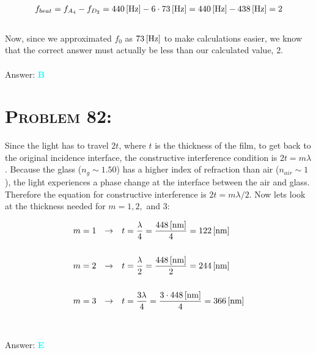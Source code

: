 \documentclass{article}
\begin{document}
\begin{gather}
\label {eq: beatfreq} f_{beat} = f_{A_{4}} - f_{D_{2}} = \unit[440]{[Hz]} - 6 \cdot  \unit[73]{[Hz]} = \unit[440]{[Hz]} - \unit[438]{[Hz]} = 2\nonumber
\end{gather}
\\
Now, since we approximated $f_{0}$ as $\unit[73]{[Hz]}$ to make calculations easier, we know that the correct answer must actually be less than our calculated value, 2. 
\\\\
Answer: \textbf{\textcolor{cyan}B}\\


\section{\textsc{Problem 82:}} Since the light has to travel $2t$, where $t$ is the thickness of the film, to get back to the original incidence interface, the constructive interference condition is $2t = m\lambda$. Because the glass ($n_{g} \sim 1.50 $) has a higher index of refraction than air ($n_{air} \sim 1$), the light experiences a phase change at the interface between the air and glass. Therefore the equation for constructive interference is $2t = m\lambda/2$. Now lets look at the thickness needed for $m = 1, 2,$ and $3$:

\begin{align}
m = 1 \hspace{.1in} &\rightarrow \hspace{.1in} t = \frac {\lambda}{4} = \frac {\unit[448]{[nm]}}{4} = \unit[122]{[nm]}\nonumber\\
\nonumber\\
%
m = 2 \hspace{.1in} &\rightarrow \hspace{.1in} t = \frac {\lambda}{2} = \frac {\unit[448]{[nm]}}{2} = \unit[244]{[nm]}\nonumber\\
\nonumber\\
%
m = 3 \hspace{.1in} &\rightarrow \hspace{.1in} t = \frac {3 \lambda}{4} = \frac {3 \cdot \unit[448]{[nm]}}{4} = \unit[366]{[nm]}\nonumber
\end{align}
\\\\
Answer: \textbf{\textcolor{cyan}E}\\
\end{document}
